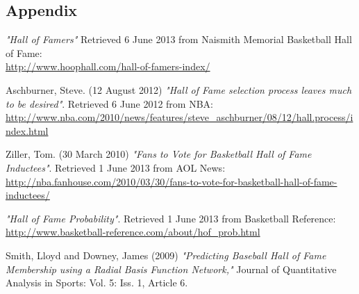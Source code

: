 \documentclass[paper=a4, fontsize=11pt]{scrartcl} %
\numberwithin{equation}{section} %
\numberwithin{figure}{section} %
\numberwithin{table}{section} %
\begin{document}
\begin{appendix}
\section{Appendix}

\end{appendix}

\begin{thebibliography}{9}

	\emph{"Hall of Famers"}
	Retrieved 6 June 2013 from Naismith Memorial Basketball Hall of Fame:\\
	\url{http://www.hoophall.com/hall-of-famers-index/} 

Aschburner, Steve. (12 August 2012)
\emph{"Hall of Fame selection process leaves much to be desired"}.
Retrieved 6 June 2012 from NBA:
\url{http://www.nba.com/2010/news/features/steve_aschburner/08/12/hall.process/index.html}   

   Ziller, Tom. (30 March 2010)
  \emph{"Fans to Vote for Basketball Hall of Fame Inductees"}.
   Retrieved 1 June 2013 from AOL News:
   \url{http://nba.fanhouse.com/2010/03/30/fans-to-vote-for-basketball-hall-of-fame-inductees/}
   
  \emph{"Hall of Fame Probability"}.
   Retrieved 1 June 2013 from Basketball Reference:\\
   \url{http://www.basketball-reference.com/about/hof_prob.html}  
 
Smith, Lloyd and Downey, James (2009)
\emph{"Predicting Baseball Hall of Fame Membership using a Radial Basis Function Network,"}
Journal of Quantitative Analysis in Sports: Vol. 5: Iss. 1, Article 6.
 
\end{thebibliography}
\end{document}
